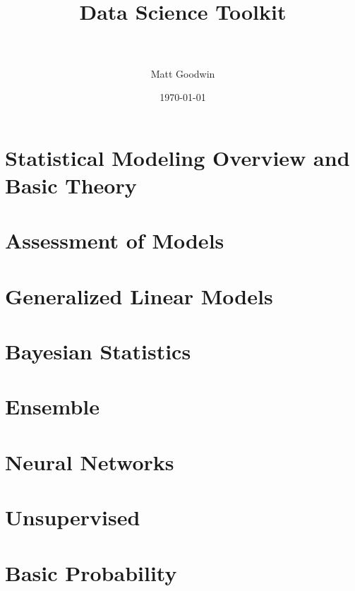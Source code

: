 \documentclass[paper=a4, fontsize=11pt]{scrartcl} %
\title{	
\normalfont \normalsize 
\horrule{0.5pt} \\[0.4cm] %
\huge Data Science Toolkit \\ %
\horrule{2pt} \\[0.5cm] %
}
\author{Matt Goodwin} %
\date{\normalsize\today} %
\numberwithin{equation}{section} %
\numberwithin{figure}{section} %
\numberwithin{table}{section} %
\begin{document}
\maketitle 

\tableofcontents
\newpage


\section{Statistical Modeling Overview and Basic Theory}


\section{Assessment of Models}


\section{Generalized Linear Models}


\section{Bayesian Statistics}


\section{Ensemble}


\section{Neural Networks}


\section{Unsupervised}




\section{Basic Probability}

\end{document}
